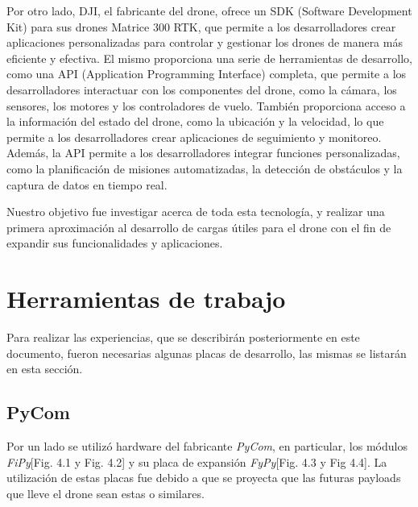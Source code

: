 \documentclass[12pt]{article}
\begin{document}
Por otro lado, DJI, el fabricante del drone, ofrece un SDK (Software Development Kit) para sus drones Matrice 300 RTK, que permite a los desarrolladores crear aplicaciones personalizadas para controlar y gestionar los drones de manera más eficiente y efectiva. El mismo proporciona una serie de herramientas de desarrollo, como una API (Application Programming Interface) completa, que permite a los desarrolladores interactuar con los componentes del drone, como la cámara, los sensores, los motores y los controladores de vuelo. También proporciona acceso a la información del estado del drone, como la ubicación y la velocidad, lo que permite a los desarrolladores crear aplicaciones de seguimiento y monitoreo. Además, la API permite a los desarrolladores integrar funciones personalizadas, como la planificación de misiones automatizadas, la detección de obstáculos y la captura de datos en tiempo real.

Nuestro objetivo fue investigar acerca de toda esta tecnología, y realizar una primera aproximación al desarrollo de cargas útiles para el drone con el fin de expandir sus funcionalidades y aplicaciones.

\newpage
\section{Herramientas de trabajo}
\justifying
Para realizar las experiencias, que se describirán posteriormente en este documento, fueron necesarias algunas placas de desarrollo, las mismas se listarán en esta sección.
\subsection{PyCom}
Por un lado se utilizó hardware del fabricante \textit{PyCom}, en particular, los módulos \textit{FiPy}[Fig. 4.1 y Fig. 4.2] y su placa de expansión \textit{FyPy}[Fig. 4.3 y Fig 4.4]. La utilización de estas placas fue debido a que se proyecta que las futuras payloads que lleve el drone sean estas o similares.
\end{document}
